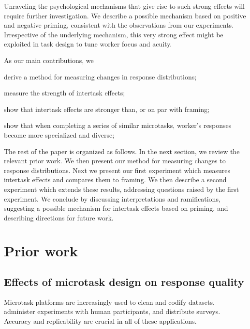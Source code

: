 \documentclass{sigchi}
\begin{document}
Unraveling the psychological mechanisms that give rise to such strong 
effects will require further investigation.  We describe a possible 
mechanism based on positive and negative priming, consistent with the
observations from our experiments.
Irrespective of the underlying mechanism, this very strong effect might 
be exploited in task design to tune worker focus and acuity.

As our main contributions, we
\begin{compactitem}%
  \item{
	derive a method for measuring changes in response distributions;
  }
  \item{measure the strength of intertask effects;}
  \item{show that intertask effects are stronger than,
	or on par with framing;}
  \item{
	show that when completing a series of similar microtasks,
	worker's responses become more specialized and diverse;
  }
\end{compactitem}

The rest of the paper is organized as follows.  In the next section, we 
review the relevant prior work.  We then present our method for 
measuring changes to response distributions.
Next we present our first experiment which measures intertask effects and
compares them to framing. We then describe a second experiment which 
extends these results, addressing questions raised by the first experiment.
We conclude by discussing interpretations and ramifications, suggesting
a possible mechanism for intertask effects based on priming, and
describing directions for future work.

\pagebreak
\section{Prior work}
\subsection{Effects of microtask design on response quality}
Microtask platforms are increasingly used to clean and codify datasets,
administer experiments with human participants, and distribute 
surveys.  Accuracy and replicability are crucial in all of these 
applications.
\end{document}
